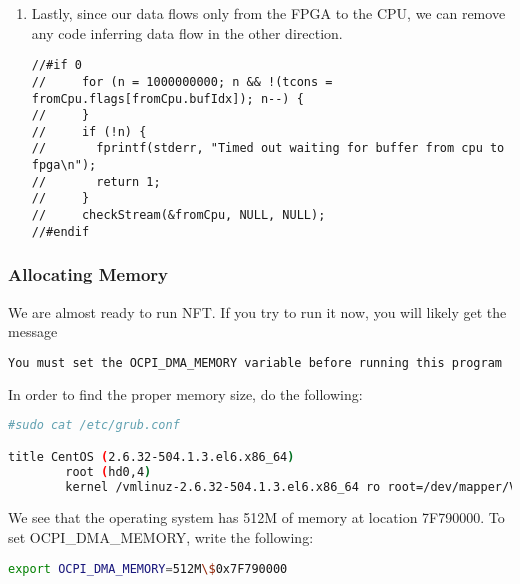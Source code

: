 \begin{enumerate}
\begin{lstlisting}[language=customc]
  setupStream(&toCpu, dp0Props, true,
              nCpuBufs, nFpgaBufs, bufSize, cpuBase, dmaBase, &dmaOffset, ramp);

//  setupStream(&toCpu, dp1Props, true,
//           nCpuBufs, nFpgaBufs, bufSize, cpuBase, dmaBase, &dmaOffset, ramp);

//start(dp1);
start(multirateCounter);
//start(bias);
//start(sma1);
\end{lstlisting}

\item Lastly, since our data flows only from the FPGA to the CPU, we can remove any code inferring data flow in the other direction.
\begin{lstlisting}[language=customc]
//#if 0
//     for (n = 1000000000; n && !(tcons = fromCpu.flags[fromCpu.bufIdx]); n--) {
//     }
//     if (!n) {
//       fprintf(stderr, "Timed out waiting for buffer from cpu to fpga\n");
//       return 1;
//     }
//     checkStream(&fromCpu, NULL, NULL);
//#endif
\end{lstlisting}
\end{enumerate}

\subsubsection{Allocating Memory}
We are almost ready to run NFT.  If you try to run it now, you will likely get the message
\begin{lstlisting}[language=bash]
You must set the OCPI_DMA_MEMORY variable before running this program
\end{lstlisting}

In order to find the proper memory size, do the following:
\begin{lstlisting}[language=bash]
#sudo cat /etc/grub.conf

title CentOS (2.6.32-504.1.3.el6.x86_64)
        root (hd0,4)
        kernel /vmlinuz-2.6.32-504.1.3.el6.x86_64 ro root=/dev/mapper/VolGroup-lv_root rd_NO_LUKS LANG=en_US.UTF-8 rd_NO_MD rd_LVM_LV=VolGroup/lv_swap memmap=512M$0x7F790000  SYSFONT=latarcyrheb-sun16 crashkernel=128M rd_LVM_LV=VolGroup/
\end{lstlisting}

We see that the operating system has 512M of memory at location 7F790000.  To set OCPI\_DMA\_MEMORY, write the following:

\begin{lstlisting}[language=bash]
export OCPI_DMA_MEMORY=512M\$0x7F790000
\end{lstlisting}

